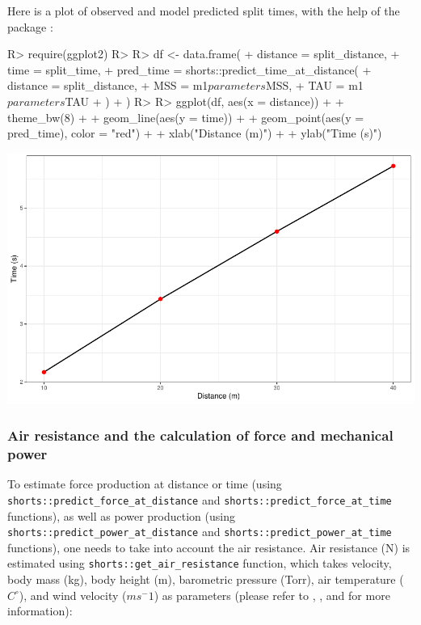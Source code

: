 \documentclass[
]{jss}
\begin{document}
Here is a plot of observed and model predicted split times, with the help of the  package \citep{R-ggplot2}:

\begin{CodeChunk}
\begin{CodeInput}
R> require(ggplot2)
R> 
R> df <- data.frame(
+   distance = split_distance,
+   time = split_time,
+   pred_time = shorts::predict_time_at_distance(
+     distance = split_distance,
+     MSS = m1$parameters$MSS,
+     TAU = m1$parameters$TAU
+   )
+ )
R> 
R> ggplot(df, aes(x = distance)) +
+   theme_bw(8) +
+   geom_line(aes(y = time)) +
+   geom_point(aes(y = pred_time), color = "red") +
+   xlab("Distance (m)") +
+   ylab("Time (s)")
\end{CodeInput}


\begin{center}\includegraphics[width=1\linewidth]{paper_files/figure-latex/unnamed-chunk-4-1} \end{center}

\end{CodeChunk}

\hypertarget{air-resistance-and-the-calculation-of-force-and-mechanical-power}{%
\subsubsection{Air resistance and the calculation of force and mechanical power}\label{air-resistance-and-the-calculation-of-force-and-mechanical-power}}

To estimate force production at distance or time (using \texttt{shorts::predict\_force\_at\_distance} and \texttt{shorts::predict\_force\_at\_time} functions), as well as power production (using \texttt{shorts::predict\_power\_at\_distance} and \texttt{shorts::predict\_power\_at\_time} functions), one needs to take into account the air resistance. Air resistance (N) is estimated using \texttt{shorts::get\_air\_resistance} function, which takes velocity, body mass (kg), body height (m), barometric pressure (Torr), air temperature (\(C^\circ\)), and wind velocity (\(ms^-1\)) as parameters (please refer to \citet{arsacModelingEnergetics100m2002}, \citet{samozinoSimpleMethodMeasuring2016}, and \citet{vaningenschenauCanCyclePower1991} for more information):
\end{document}
